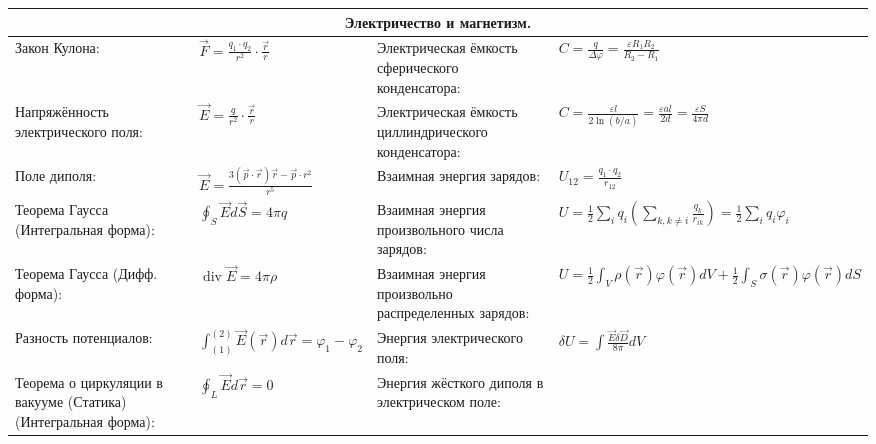\documentclass{article}
\begin{document}
\begin{tabular}{ |p{6cm}|p{3.5cm}|p{6cm}|p{3.5cm}|  }
\hline
\multicolumn{4}{|c|}{Электричество и магнетизм.} \\
\hline
Закон Кулона:                                                              &
$\vec F = \frac{q_1 \cdot q_2}{r^2} \cdot \frac{\vec r}{r}$                &
Электрическая ёмкость сферического конденсатора:                           &
$C=\frac{q}{\Delta \varphi}=\frac{\varepsilon R_{1} R_{2}}{R_{2}-R_{1}}$   \\
\hline
Напряжённость электрического поля:                                         &
$\vec E = \frac{q}{r^2} \cdot \frac{\vec r}{r}$                            &
Электрическая ёмкость циллиндрического конденсатора:                       &
$C=\frac{\varepsilon l}{2 \ln (b / a)}=\frac{\varepsilon a l}{2 d}=\frac{\varepsilon S}{4 \pi d}$\\
\hline
Поле диполя:                                                               &
$\vec E = \frac{3(\vec p \cdot \vec r) \vec r- \vec p \cdot r^{2}}{r^{5}}$ &
Взаимная энергия зарядов:                                                  &
$U_{12}=\frac {q_{1} \cdot q_{2}}{r_{12}}$                                 \\
\hline
Теорема Гаусса (Интегральная форма):                                       &
$\oint_{S} {\vec E} d {\vec S} = 4 \pi q$                                  &
Взаимная энергия произвольного числа зарядов:                              & 
$U=\frac{1}{2} \sum_{i} q_{i}\left(\sum_{k, k \neq i} \frac{q_{k}}{r_{i k}}\right)=\frac{1}{2} \sum_{i} q_{i} \varphi_{i}$ \\
\hline
Теорема Гаусса (Дифф. форма):                                              &
$\operatorname{div} {\vec E} = 4 \pi \rho$                                 &
Взаимная энергия произвольно распределенных зарядов:                       &
$U=\frac{1}{2} \int_{V} \rho(\vec{r}) \varphi(\vec{r}) d V+\frac{1}{2} \int_{S} \sigma(\vec{r}) \varphi(\vec{r}) d S$ \\
\hline
Разность потенциалов:                                                      &
$\int_{(1)}^{(2)} {\vec E}({\vec r}) d {\vec r}=\varphi_{1}-\varphi_{2}$   &
Энергия электрического поля:                                               &
$\delta U=\int \frac{\vec{E} \delta \vec{D}}{8 \pi} d V$ \\
\hline
Теорема о циркуляции в вакууме (Статика) (Интегральная форма):             &
$\oint_{L} {\vec E} d {\vec r} = 0$                                        &
Энергия жёсткого диполя в электрическом поле:                              &

\end{tabular}
\end{document}
